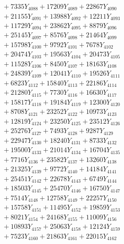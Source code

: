 \documentclass[a4paper,10pt]{article}
\begin{document}
{\begin{align}
&\;  + 7335 Y_{4088} + 17209 Y_{4089} + 22867 Y_{4090} \\[0.3ex]
&\;  + 21155 Y_{4091} + 13988 Y_{4092} + 12211 Y_{4093} \\[0.3ex]
&\;  + 11729 Y_{4094} + 23862 Y_{4095} + 8879 Y_{4096} \\[0.3ex]
&\;  + 25145 Y_{4097} + 8576 Y_{4098} + 21464 Y_{4099} \\[0.3ex]
&\;  + 15798 Y_{4100} + 9792 Y_{4101} + 7678 Y_{4102} \\[0.3ex]
&\;  + 20474 Y_{4103} + 19563 Y_{4104} + 20473 Y_{4105} \\[0.3ex]
&\;  + 11528 Y_{4106} + 8450 Y_{4107} + 18163 Y_{4108} \\[0.5ex]\allowbreak
&\;  + 24839 Y_{4109} + 12041 Y_{4110} + 19526 Y_{4111} \\[0.3ex]
&\;  + 6823 Y_{4112} + 15840 Y_{4113} + 22186 Y_{4114} \\[0.3ex]
&\;  + 21280 Y_{4115} + 7730 Y_{4116} + 16630 Y_{4117} \\[0.3ex]
&\;  + 15817 Y_{4118} + 19184 Y_{4119} + 12300 Y_{4120} \\[0.3ex]
&\;  + 8708 Y_{4121} + 23252 Y_{4122} + 10973 Y_{4123} \\[0.3ex]
&\;  + 12819 Y_{4124} + 23250 Y_{4125} + 23512 Y_{4126} \\[0.3ex]
&\;  + 25276 Y_{4127} + 7493 Y_{4128} + 9287 Y_{4129} \\[0.3ex]
&\;  + 22947 Y_{4130} + 18240 Y_{4131} + 8733 Y_{4132} \\[0.3ex]
&\;  + 19500 Y_{4133} + 21014 Y_{4134} + 16704 Y_{4135} \\[0.3ex]
&\;  + 7716 Y_{4136} + 23582 Y_{4137} + 13260 Y_{4138} \\[0.5ex]\allowbreak
&\;  + 21325 Y_{4139} + 9772 Y_{4140} + 14184 Y_{4141} \\[0.3ex]
&\;  + 25451 Y_{4142} + 22678 Y_{4143} + 6749 Y_{4144} \\[0.3ex]
&\;  + 18503 Y_{4145} + 25470 Y_{4146} + 16750 Y_{4147} \\[0.3ex]
&\;  + 7514 Y_{4148} + 12758 Y_{4149} + 22257 Y_{4150} \\[0.3ex]
&\;  + 15758 Y_{4151} + 11495 Y_{4152} + 19859 Y_{4153} \\[0.3ex]
&\;  + 8021 Y_{4154} + 24168 Y_{4155} + 11009 Y_{4156} \\[0.3ex]
&\;  + 10893 Y_{4157} + 25063 Y_{4158} + 12124 Y_{4159} \\[0.3ex]
&\;  + 7523 Y_{4160} + 21863 Y_{4161} + 22015 Y_{4162} \\[0.3ex]

\end{align}}
\end{document}
